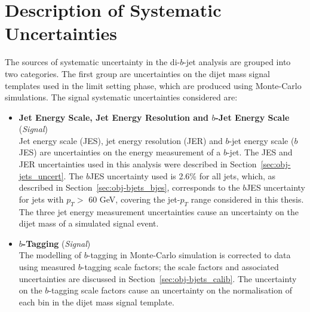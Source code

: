 \section{Description of Systematic Uncertainties}
\label{sec:lim-syst}

The sources of systematic uncertainty in the di-$b$-jet analysis are grouped into two categories.
The first group are uncertainties on the dijet mass signal templates used in the limit setting phase, which are produced using Monte-Carlo simulations.
The signal systematic uncertainties considered are:
\vspace{-0.5em}
\begin{itemize}[leftmargin=*]
\item\textbf{Jet Energy Scale, Jet Energy Resolution  and $b$-Jet Energy Scale} \hspace{1mm} (\textit{Signal})\\
  Jet energy scale (JES), jet energy resolution (JER) and  $b$-jet energy scale ($b$JES) are uncertainties
  on the energy measurement of a $b$-jet.
  The JES and JER uncertainties used in this analysis were described in Section~\ref{sec:obj-jets_uncert}.
  The $b$JES uncertainty used is 2.6\% for all jets, which, 
  as described in Section~\ref{sec:obj-bjets_bjes}, corresponds to the $b$JES uncertainty for jets with $p_T >$ 60 GeV,
  covering the jet-$p_T$ range considered in this thesis.
  The three jet energy measurement uncertainties cause an uncertainty on the dijet mass of a simulated signal event.\vspace{0.5em}

\item\textbf{$b$-Tagging} \hspace{1mm} (\textit{Signal})\\
  The modelling of $b$-tagging in Monte-Carlo simulation is corrected to data using measured $b$-tagging scale factors;
  the scale factors and associated uncertainties are discussed in Section~\ref{sec:obj-bjets_calib}.
  The uncertainty on the $b$-tagging scale factors cause an uncertainty on the normalisation of each bin in the dijet mass signal template.
  \vspace{0.3em}


\end{itemize}
